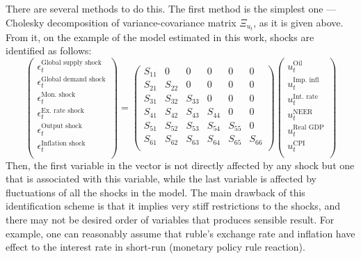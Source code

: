 \documentclass[12pt, a4paper]{extarticle}
\begin{document}
There are several methods to do this. The first method is the simplest one --- Cholesky decomposition of variance-covariance matrix $\Xi_{u_t}$, as it is given above. From it, on the example of the model estimated in this work, shocks are identified as follows:
\begin{equation}
	\begin{pmatrix}
		\epsilon^{\text{Global supply shock}}_t\\
		\epsilon^{\text{Global demand shock}}_t\\
		\epsilon^{\text{Mon. shock}}_t\\
		\epsilon^{\text{Ex. rate shock}}_t\\
		\epsilon^{\text{Output shock}}_t\\
		\epsilon^{\text{Inflation shock}}_t\\
	\end{pmatrix} = 
	\begin{pmatrix}
		S_{11} & 0 & 0 & 0 & 0 & 0\\
		S_{21} & S_{22} & 0 & 0 & 0 & 0\\
		S_{31} & S_{32} & S_{33} & 0 & 0 & 0\\
		S_{41} & S_{42} & S_{43} & S_{44} & 0 & 0\\
		S_{51} & S_{52} & S_{53} & S_{54} & S_{55} & 0\\
		S_{61} & S_{62} & S_{63} & S_{64} & S_{65} & S_{66}\\
	\end{pmatrix} 
	\begin{pmatrix}
		u^{\text{Oil}}_t\\
		u^{\text{Imp. infl}}_t\\
		u^{\text{Int. rate}}_t\\
		u^{\text{NEER}}_t\\
		u^{\text{Real GDP}}_t\\
		u^{\text{CPI}}_t\\
	\end{pmatrix}
\end{equation}
Then, the first variable in the vector is not directly affected by any shock but one that is associated with this variable, while the last variable is affected by fluctuations of all the shocks in the model. The main drawback of this identification scheme is that it implies very stiff restrictions to the shocks, and there may not be desired order of variables that produces sensible result. For example, one can reasonably assume that ruble's exchange rate and inflation have effect to the interest rate in short-run (monetary policy rule reaction).
\end{document}
